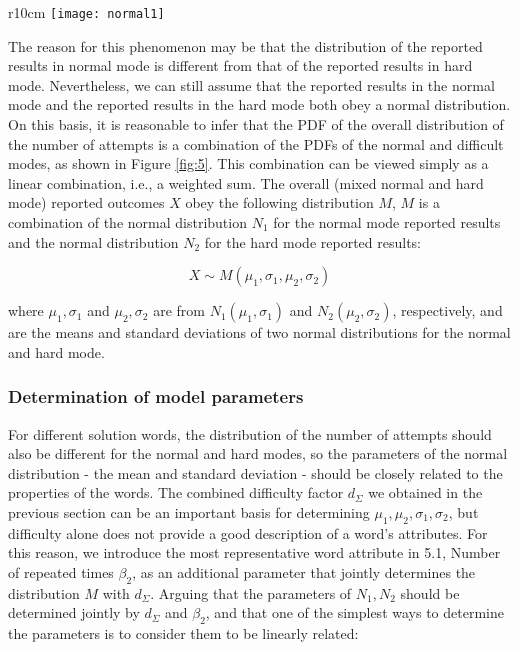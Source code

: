 \documentclass[12pt]{mcmthesis}
\begin{document}
\begin{wrapfigure}{r}{10cm}
	\small
	\centering
	\texttt{[image: normal1]}
	\caption{Two normal distribution probability density synthesis} 
	\label{fig:5}
\end{wrapfigure}
The reason for this phenomenon may be that the distribution of the reported results in normal mode is different from that of the reported results in hard mode. Nevertheless, we can still assume that the reported results in the normal mode and the reported results in the hard mode both obey a normal distribution. On this basis, it is reasonable to infer that the PDF of the overall distribution of the number of attempts is a combination of the PDFs of the normal and difficult modes, as shown in Figure \ref{fig:5}. This combination can be viewed simply as a linear combination, i.e., a weighted sum. The overall (mixed normal and hard mode) reported outcomes $ X $ obey the following distribution $ M $, $ M $ is a combination of the normal distribution $ N_{1} $ for the normal mode reported results and the normal distribution $ N_{2} $ for the hard mode reported results:

\begin{equation}\label{eq:4}
X\sim M\left( \mu _1,\sigma _1,\mu _2,\sigma _2 \right)
\end{equation}

where $ \mu _1,\sigma _1 $ and $ \mu _2,\sigma _2 $ are from $ N_{1}(\mu _1,\sigma _1) $ and $ N_{2}(\mu _2,\sigma _2) $, respectively, and are the means and standard deviations of two normal distributions for the normal and hard mode.
\\[0.01pt]
\subsubsection{Determination of model parameters}
\hspace{1.4em}For different solution words, the distribution of the number of attempts should also be different for the normal and hard modes, so the parameters of the normal distribution - the mean and standard deviation - should be closely related to the properties of the words. The combined difficulty factor $ d_{\varSigma } $ we obtained in the previous section can be an important basis for determining $ \mu _1,\mu _2,\sigma _1,\sigma _2 $, but difficulty alone does not provide a good description of a word's attributes. For this reason, we introduce the most representative word attribute in 5.1, Number of repeated times $\beta_2$, as an additional parameter that jointly determines the distribution $ M $ with $ d_{\varSigma } $. Arguing that the parameters of $ N_{1},N_{2} $ should be determined jointly by $ d_{\varSigma } $ and $\beta_2$, and that one of the simplest ways to determine the parameters is to consider them to be linearly related:
\end{document}
